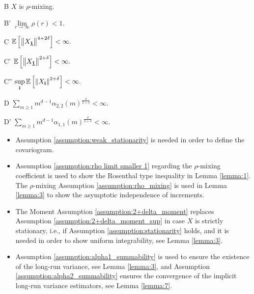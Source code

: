 \begin{assumptionp}{B} \label{assumption:rho_mixing}
    $X$ is $\rho$-mixing.
\end{assumptionp}

\begin{assumptionp}{B'} \label{assumption:rho limit smaller 1}
    $ \lim\limits_{r \to \infty} \rho(r) < 1. $
\end{assumptionp}

\begin{assumptionp}{C} \label{assumption:4+2delta_moment}
    $ \EE{\left\| X_{\usbf[1]} \right\|^{4+2\delta}} < \infty. $
\end{assumptionp}

\begin{assumptionp}{C'} \label{assumption:2+delta_moment}
    $ \EE{\left\| X_{\usbf[1]} \right\|^{2+\delta}} < \infty. $
\end{assumptionp}

\begin{assumptionp}{C''} \label{assumption:2+delta_moment_sup}
    $\sup\limits_{\mathbf{i}} \mathbb{E}\left[\left\| X_{\mathbf{i}} \right\|^{2+\delta}\right] < \infty. $
\end{assumptionp}

\begin{assumptionp}{D} \label{assumption:alpha2_summability}
    $ \sum\limits_{m \geq 1} m^{d-1} \alpha_{2, 2}(m)^{\frac{\delta}{2+\delta}} < \infty. $
\end{assumptionp}

\begin{assumptionp}{D'} \label{assumption:alpha1_summability}
    $ \sum\limits_{m \geq 1} m^{d-1} \alpha_{1, 1}(m)^{\frac{\delta}{2+\delta}} < \infty. $
\end{assumptionp}


\begin{remark}
    \begin{itemize}
        \item Assumption \ref{assumption:weak_stationarity} is needed in order to define the covariogram.
        \item Assumption \ref{assumption:rho limit smaller 1} regarding the $\rho$-mixing coefficient is used to show the Rosenthal type inequality in Lemma \ref{lemma:1}. The $\rho$-mixing Assumption \ref{assumption:rho_mixing} is used in Lemma \ref{lemma:3} to show the asymptotic independence of increments.
        \item The Moment Assumption \ref{assumption:2+delta_moment} replaces Assumption \ref{assumption:2+delta_moment_sup} in case $X$ is strictly stationary, i.e., if Assumption \ref{assumption:stationarity} holds, and it is needed in order to show uniform integrability, see Lemma \ref{lemma:3}.
        \item Assumption \ref{assumption:alpha1_summability} is used to ensure the existence of the long-run variance, see Lemma \ref{lemma:3}, and Assumption \ref{assumption:alpha2_summability} ensures the convergence of the implicit long-run variance estimators, see Lemma \ref{lemma:7}.
    \end{itemize}
\end{remark}

